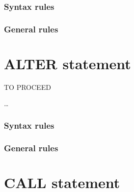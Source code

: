 \subsubsection{Syntax rules}

\subsubsection{General rules}

\section{ALTER statement}

\begin{syntax}[\deletedcolour]
    \begin{1=}
      \procedurename TO PROCEED  \procedurename
    \end{1=} \ldots
\end{syntax}

\subsubsection{Syntax rules}

\subsubsection{General rules}

\section{CALL statement}

